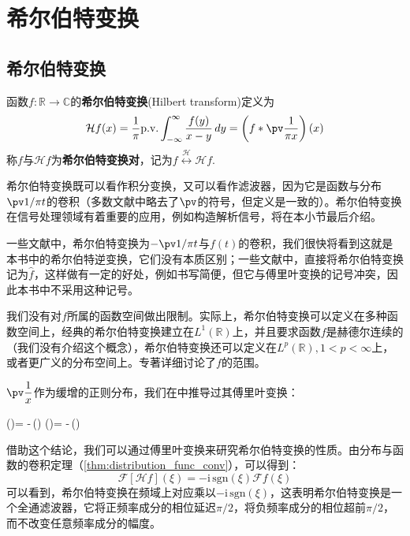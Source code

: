 \section{希尔伯特变换}\label{sec:Hilbert}

\subsection{希尔伯特变换}\label{sub:hilbert}

\begin{definition}[希尔伯特变换]
    函数$f:\mathbb{R}\to\mathbb{C}$的\textbf{希尔伯特变换}(Hilbert transform)定义为
    \[\mathcal{H} f(x)=\frac{1}{\pi}\text{p.v.}\int_{-\infty}^{\infty}\frac{f(y)}{x-y}\,dy=\left(f*\pv\frac{1}{\pi x}\right)(x)\]
    称$f$与$\mathcal{H} f$为\textbf{希尔伯特变换对}，记为$f\overset{\mathcal{H} }{\longleftrightarrow} \mathcal{H} f$.
\end{definition}

希尔伯特变换既可以看作积分变换，又可以看作滤波器，因为它是函数与分布$\pv 1/\pi t$的卷积（多数文献中略去了$\pv$的符号，但定义是一致的）。希尔伯特变换在信号处理领域有着重要的应用，例如构造解析信号，将在本小节最后介绍。

\begin{remark}
    一些文献中\cite{brad_osgood_ee261}，希尔伯特变换为$-\pv 1/\pi t$与$f(t)$的卷积，我们很快将看到这就是本书中的希尔伯特逆变换，它们没有本质区别；一些文献中\cite{signal_systems}，直接将希尔伯特变换记为$\hat{f}$，这样做有一定的好处，例如书写简便，但它与傅里叶变换的记号冲突，因此本书中不采用这种记号。
\end{remark}
\begin{remark}
    我们没有对$f$所属的函数空间做出限制。实际上，希尔伯特变换可以定义在多种函数空间上，经典的希尔伯特变换建立在$L^1(\mathbb{R})$上，并且要求函数$f$是赫德尔连续的（我们没有介绍这个概念），希尔伯特变换还可以定义在$L^p(\mathbb{R}),1<p<\infty$上，或者更广义的分布空间上。专著\cite{hilbert_transform}详细讨论了$f$的范围。
\end{remark}

$\pv\dfrac{1}{x}$作为缓增的正则分布，我们在中推导过其傅里叶变换：
\begin{lralign}
     (\xi)= -\,(\xi)
    \switch
     (\omega)= -\,(\omega)
\end{lralign}

借助这个结论，我们可以通过傅里叶变换来研究希尔伯特变换的性质。由分布与函数的卷积定理（\cref{thm:distribution_func_conv}），可以得到：
    \[\mathcal{F} [\mathcal{H} f](\xi)=-\mathrm{i}\,\text{sgn}(\xi)\mathcal{F} f(\xi)\]
可以看到，希尔伯特变换在频域上对应乘以$-\mathrm{i}\,\text{sgn}(\xi)$，这表明希尔伯特变换是一个全通滤波器，它将正频率成分的相位延迟$\pi/2$，将负频率成分的相位超前$\pi/2$，而不改变任意频率成分的幅度。

